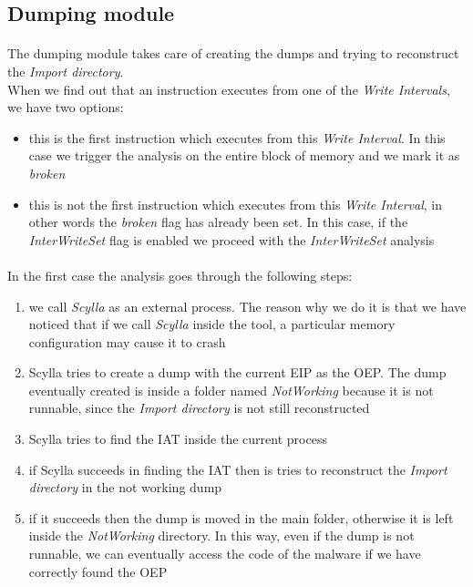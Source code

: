 \subsection{Dumping module}
\label{Dumping module}
\paragraph{}
The dumping module takes care of creating the dumps and trying to reconstruct the \textit{Import directory}.\\
When we find out that an instruction executes from one of the \textit{Write Intervals}, we have two options:
\begin{itemize}
\item this is the first instruction which executes from this \textit{Write Interval}. In this case we trigger the analysis on the entire block of memory and we mark it as \textit{broken}
\item this is not the first instruction which executes from this \textit{Write Interval}, in other words the \textit{broken} flag has already been set. In this case, if the \textit{InterWriteSet} flag is enabled we proceed with the \textit{InterWriteSet} analysis
\end{itemize}
\paragraph{}
In the first case the analysis goes through the following steps:
\begin{enumerate}
\item we call \textit{Scylla} as an external process. The reason why we do it is that we have noticed that if we call \textit{Scylla} inside the tool, a particular memory configuration may cause it to crash
\item Scylla tries to create a dump with the current EIP as the OEP. The dump eventually created is inside a folder named \textit{NotWorking} because it is not runnable, since the \textit{Import directory} is not still reconstructed
\item Scylla tries to find the IAT inside the current process
\item if Scylla succeeds in finding the IAT then is tries to reconstruct the \textit{Import directory} in the not working dump
\item if it succeeds then the dump is moved in the main folder, otherwise it is left inside the \textit{NotWorking} directory. In this way, even if the dump is not runnable, we can eventually access the code of the malware if we have correctly found the OEP
\end{enumerate} 
